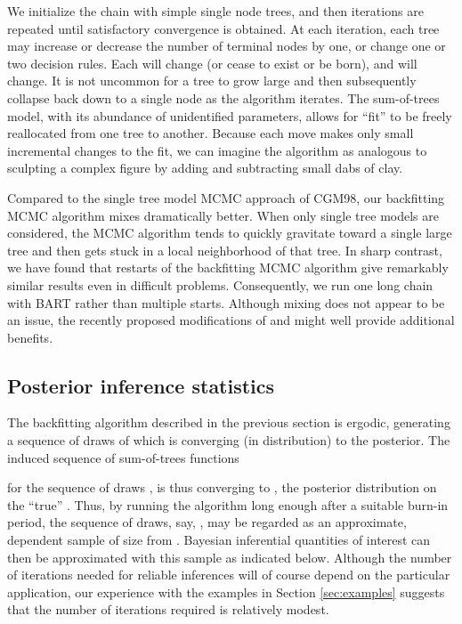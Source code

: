 \documentclass[aoas,nameyear,dvips]{arximspdf}
\newcommand{\citeasnoun}[1]{\citet{#1}}
\begin{document}
We initialize the chain with  simple single node trees, and then
iterations are repeated until satisfactory convergence is
obtained.  At each iteration, each tree may increase or decrease
the number of terminal nodes by one, or change one or two decision
rules.  Each  will change (or cease to exist or be born), and
 will change. It is not uncommon for a tree to grow large
and then subsequently collapse back down to a single node as the
algorithm iterates. The sum-of-trees model, with its abundance of
unidentified parameters, allows for ``fit'' to be freely
reallocated from one tree to another. Because each move makes only
small incremental changes to the fit, we can imagine the algorithm
as analogous to sculpting a complex figure by adding and
subtracting small dabs of clay.

Compared to the single tree model MCMC approach of CGM98, our
backfitting MCMC algorithm mixes dramatically better.  When only
single tree models are considered, the MCMC algorithm tends to
quickly gravitate toward a single large tree and then gets stuck
in a local neighborhood of that tree. In sharp contrast, we have
found that restarts of the backfitting MCMC algorithm give
remarkably similar results even in difficult problems.
Consequently, we run one long chain with BART rather than multiple
starts.  Although mixing does not appear to be an issue, the
recently proposed modifications of \citeasnoun{Blan2004} and \citeasnoun{WuTjeWes2007}
might well provide additional benefits.

\subsection{Posterior inference statistics}\label{sec:estpd}


The backfitting algorithm described in the previous section is ergodic,
generating a sequence of draws of 
which is converging (in distribution) to the posterior\break .  The induced sequence of sum-of-trees
functions

for the sequence of draws , is
thus converging to , the posterior distribution on the
``true'' .  Thus, by running the algorithm long enough after
a suitable burn-in period, the sequence of  draws, say,
, may be regarded as an approximate, dependent
sample of size  from .  Bayesian inferential quantities
of interest can then be approximated with this sample as indicated
below.  Although the number of iterations needed for reliable
inferences will of course depend on the particular application, our
experience with the examples in Section \ref{sec:examples} suggests
that the number of iterations required is relatively modest.
\end{document}

